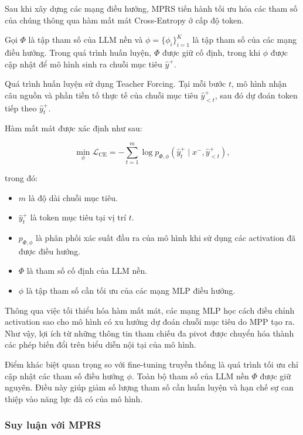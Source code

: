 Sau khi xây dựng các mạng điều hướng, MPRS tiến hành tối ưu hóa các tham số của chúng thông qua hàm mất mát Cross-Entropy ở cấp độ token.

Gọi $\Phi$ là tập tham số của LLM nền và $\phi=\{\phi_i\}_{i=1}^{K}$ là tập tham số của các mạng điều hướng. Trong quá trình huấn luyện, $\Phi$ được giữ cố định, trong khi $\phi$ được cập nhật để mô hình sinh ra chuỗi mục tiêu $\hat{y}^{+}$.

Quá trình huấn luyện sử dụng Teacher Forcing. Tại mỗi bước $t$, mô hình nhận câu nguồn và phần tiền tố thực tế của chuỗi mục tiêu $\hat{y}_{<t}^{+}$, sau đó dự đoán token tiếp theo $\hat{y}_{t}^{+}$.

Hàm mất mát được xác định như sau:

\begin{equation}
	\min_{\phi}\mathcal{L}_{\mathrm{CE}}
	=
	-\sum_{t=1}^{m}
	\log
	p_{\Phi,\phi}
	\left(
	\hat{y}_{t}^{+}
	\mid
	x^-,
	\hat{y}_{<t}^{+}
	\right),
	\label{eq:mprs-loss}
\end{equation}

trong đó:

\begin{itemize}
	\item $m$ là độ dài chuỗi mục tiêu.
	\item $\hat{y}_{t}^{+}$ là token mục tiêu tại vị trí $t$.
	\item $p_{\Phi,\phi}$ là phân phối xác suất đầu ra của mô hình khi sử dụng các activation đã được điều hướng.
	\item $\Phi$ là tham số cố định của LLM nền.
	\item $\phi$ là tập tham số cần tối ưu của các mạng MLP điều hướng.
\end{itemize}

Thông qua việc tối thiểu hóa hàm mất mát, các mạng MLP học cách điều chỉnh activation sao cho mô hình có xu hướng dự đoán chuỗi mục tiêu do MPP tạo ra. Như vậy, lợi ích từ những thông tin tham chiếu đa pivot được chuyển hóa thành các phép biến đổi trên biểu diễn nội tại của mô hình.

Điểm khác biệt quan trọng so với fine-tuning truyền thống là quá trình tối ưu chỉ cập nhật các tham số điều hướng $\phi$. Toàn bộ tham số của LLM nền $\Phi$ được giữ nguyên. Điều này giúp giảm số lượng tham số cần huấn luyện và hạn chế sự can thiệp vào năng lực đã có của mô hình.

\subsubsection*{Suy luận với MPRS}

